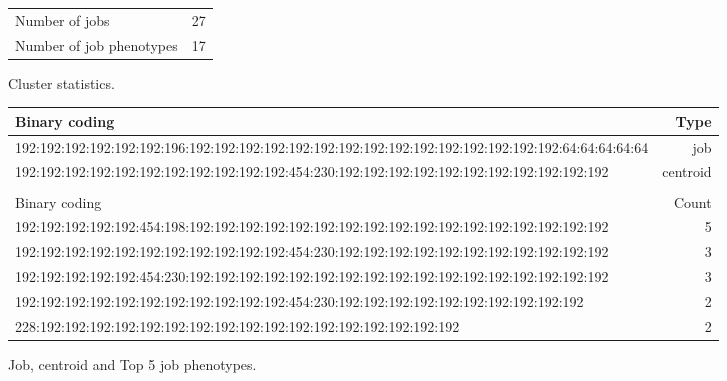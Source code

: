 \documentclass{jhps}
\begin{document}
\noindent\begin{minipage}{\textwidth}
\captionsetup{type=table}

\begingroup
  \begin{subtable}{\textwidth}
  \centering
  \begin{tabular}{ll}
    Number of jobs & 27 \\
    Number of job phenotypes & 17 \\
  \end{tabular}
  \caption{Cluster statistics.}
  \label{tab:use_case:bin_all:stats}
\end{subtable}
\endgroup

\medskip

\begingroup
  \begin{subtable}{\textwidth}
  \centering
  \begin{tiny}
    \begin{tabular}{l|r}
      \rowcolor{tblhead}
      Binary coding                                                                                          &  Type     \\
      \hline
      192:192:192:192:192:192:196:192:192:192:192:192:192:192:192:192:192:192:192:192:192:192:64:64:64:64:64 &  job      \\
      192:192:192:192:192:192:192:192:192:192:192:454:230:192:192:192:192:192:192:192:192:192:192:192        &  centroid \\
      \multicolumn{2}{l}{}                                                                                   \\
      \rowcolor{tblhead}
      Binary coding                                                                                          &  Count    \\
      \hline
      192:192:192:192:192:454:198:192:192:192:192:192:192:192:192:192:192:192:192:192:192:192:192:192        &  5        \\
      192:192:192:192:192:192:192:192:192:192:192:454:230:192:192:192:192:192:192:192:192:192:192:192        &  3        \\
      192:192:192:192:192:454:230:192:192:192:192:192:192:192:192:192:192:192:192:192:192:192:192:192        &  3        \\
      192:192:192:192:192:192:192:192:192:192:192:454:230:192:192:192:192:192:192:192:192:192:192            &  2        \\
      228:192:192:192:192:192:192:192:192:192:192:192:192:192:192:192:192:192                                &  2        \\
    \end{tabular}
  \end{tiny}
  \caption{Job, centroid and Top 5 job phenotypes.}
  \label{tab:use_case:bin_all:top_jobs}
\end{subtable}
\endgroup


\end{minipage}
\end{document}
